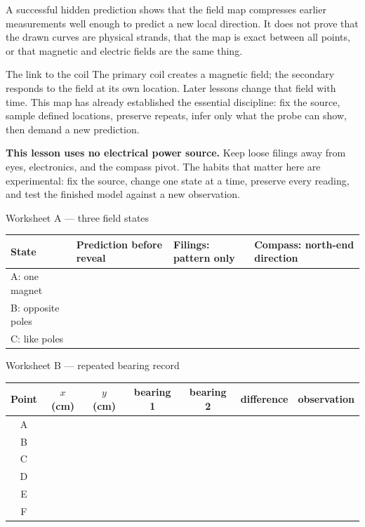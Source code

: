 A successful hidden prediction shows that the field map compresses earlier
measurements well enough to predict a new local direction. It does not prove
that the drawn curves are physical strands, that the map is exact between all
points, or that magnetic and electric fields are the same thing.

\begin{telospanel}{The link to the coil}
The primary coil creates a magnetic field; the secondary responds to the field
at its own location. Later lessons change that field with time. This map has
already established the essential discipline: fix the source, sample defined
locations, preserve repeats, infer only what the probe can show, then demand a
new prediction.
\end{telospanel}
\begin{telosframe}
\textbf{This lesson uses no electrical power source.} Keep loose filings away
from eyes, electronics, and the compass pivot. The habits that matter here are
experimental: fix the source, change one state at a time, preserve every
reading, and test the finished model against a new observation.
\end{telosframe}

\newpage
{}
\small
\begin{teloscard}{Worksheet A --- three field states}
\footnotesize
\begin{tabularx}{\linewidth}{@{}p{.13\linewidth}L L L@{}}
\toprule
State & Prediction before reveal & Filings: pattern only &
Compass: north-end direction\\
\midrule
A: one magnet & & &\\[1.4em]
B: opposite poles & & &\\[1.4em]
C: like poles & & &\\
\bottomrule
\end{tabularx}
\end{teloscard}

\begin{teloscard}{Worksheet B --- repeated bearing record}
\footnotesize
\begin{tabularx}{\linewidth}{@{}c c c c c c L@{}}
\toprule
Point & \(x\) (cm) & \(y\) (cm) & bearing 1 & bearing 2 &
difference & observation\\
\midrule
A & & & & & &\\[1em]
B & & & & & &\\[1em]
C & & & & & &\\[1em]
D & & & & & &\\[1em]
E & & & & & &\\[1em]
F & & & & & &\\
\bottomrule
\end{tabularx}
\end{teloscard}

